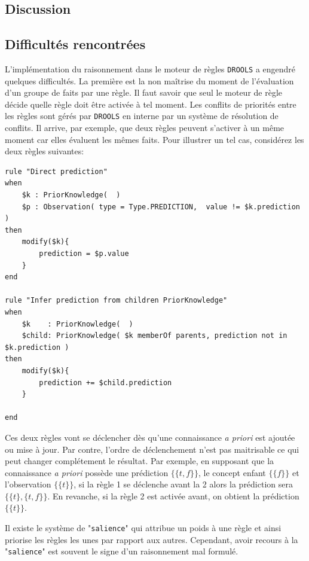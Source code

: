 \begin{refsegment}


\section{Discussion}
\subsection{Difficultés rencontrées}
L'implémentation du raisonnement dans le moteur de règles \texttt{DROOLS} a engendré quelques difficultés. La première est la non maîtrise du moment de l'évaluation d'un groupe de faits par une règle. Il faut savoir que seul le moteur de règle décide quelle règle doit être activée à tel moment. Les conflits de priorités entre les règles sont gérés par \texttt{DROOLS} en interne par un système de résolution de conflits. Il arrive, par exemple, que deux règles peuvent s'activer à un même moment car elles évaluent les mêmes faits. Pour illustrer un tel cas, considérez les deux règles suivantes:

\begin{lstlisting}[style=drl-style,caption=conflit]
rule "Direct prediction"
when
	$k : PriorKnowledge(  )
	$p : Observation( type = Type.PREDICTION,  value != $k.prediction )
then
	modify($k){
		prediction = $p.value
	}
end

rule "Infer prediction from children PriorKnowledge"
when
	$k    : PriorKnowledge(  )
	$child: PriorKnowledge( $k memberOf parents, prediction not in $k.prediction )
then
	modify($k){
		prediction += $child.prediction
	}

end
\end{lstlisting}

Ces deux règles vont se déclencher dès qu'une connaissance \textit{a priori} est ajoutée ou mise à jour. Par contre, l'ordre de déclenchement n'est pas maitrisable ce qui peut changer complétement le résultat. Par exemple, en supposant que la connaissance \textit{a priori}  possède une prédiction $\{\{t,f\}\}$, le concept enfant  $\{\{f\}\}$ et l'observation $\{\{t\}\}$, si la règle 1 se déclenche avant la 2 alors la prédiction sera $\{\{t\},\{t,f\}\}$. En revanche, si la règle 2 est activée avant, on obtient la prédiction  $\{\{t\}\}$.

Il existe le système de "\texttt{salience}" qui attribue un poids à une règle et ainsi priorise les règles les unes par rapport aux autres.  Cependant, avoir recours à la "\texttt{salience}" est souvent le signe d'un raisonnement mal formulé.


\end{refsegment}
